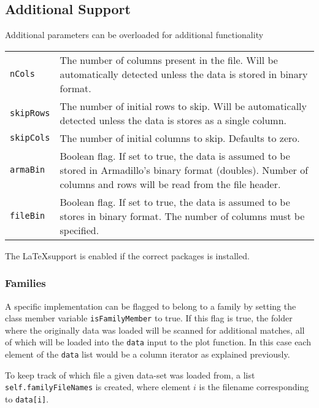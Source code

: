 \subsection{Additional Support}

Additional parameters can be overloaded for additional functionality

\begin{small}
\begin{tabular}{lp{14cm}}
\verb+nCols+ & The number of columns present in the file. Will be automatically detected unless the data is stored in binary format.\\
\verb+skipRows+ & The number of initial rows to skip. Will be automatically detected unless the data is stores as a single column.\\
\verb+skipCols+ & The number of initial columns to skip. Defaults to zero.\\
\verb+armaBin+ & Boolean flag. If set to true, the data is assumed to be stored in Armadillo's binary format (doubles). Number of columns and rows will be read from the file header.\\
\verb+fileBin+ & Boolean flag. If set to true, the data is assumed to be stores in binary format. The number of columns must be specified.
\end{tabular}
\end{small}

The \LaTeX support is enabled if the correct packages is installed.

\subsubsection{Families}

A specific implementation can be flagged to belong to a family by setting the class member variable \verb+isFamilyMember+ to true. If this flag is true, the folder where the originally data was loaded will be scanned for additional matches, all of which will be loaded into the \verb+data+ input to the plot function. In this case each element of the \verb+data+ list would be a column iterator as explained previously.

To keep track of which file a given data-set was loaded from, a list \verb+self.familyFileNames+ is created, where element $i$ is the filename corresponding to \verb+data[i]+.

